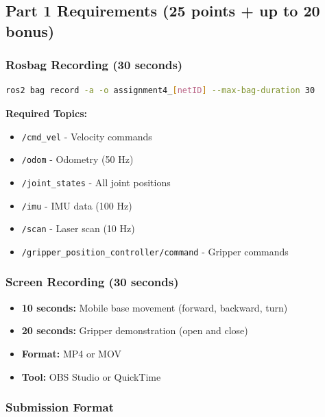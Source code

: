 \documentclass[11pt,a4paper]{article}
\begin{document}
\subsection{Part 1 Requirements (25 points + up to 20 bonus)}

\subsubsection{\faCheckSquare\space Rosbag Recording (30 seconds)}

\begin{lstlisting}[language=bash]
ros2 bag record -a -o assignment4_[netID] --max-bag-duration 30
\end{lstlisting}

\begin{infobox}
\textbf{Required Topics:}
\begin{itemize}[nosep]
    \item \texttt{/cmd\_vel} - Velocity commands
    \item \texttt{/odom} - Odometry (50 Hz)
    \item \texttt{/joint\_states} - All joint positions
    \item \texttt{/imu} - IMU data (100 Hz)
    \item \texttt{/scan} - Laser scan (10 Hz)
    \item \texttt{/gripper\_position\_controller/command} - Gripper commands
\end{itemize}
\end{infobox}

\subsubsection{\faCheckSquare\space Screen Recording (30 seconds)}

\begin{itemize}
    \item \textbf{10 seconds:} Mobile base movement (forward, backward, turn)
    \item \textbf{20 seconds:} Gripper demonstration (open and close)
    \item \textbf{Format:} MP4 or MOV
    \item \textbf{Tool:} OBS Studio or QuickTime
\end{itemize}

\subsubsection{\faCheckSquare\space Submission Format}
\end{document}
